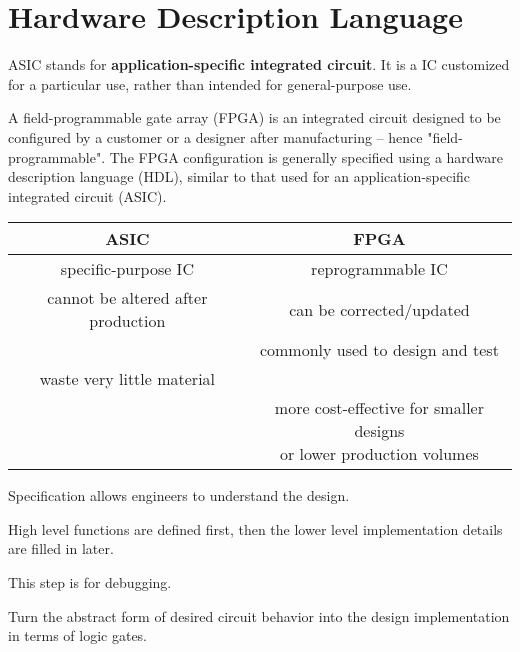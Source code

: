 \chapter{Hardware Description Language}

        \par ASIC stands for \textbf{application-specific integrated circuit}.
        It is a IC customized for a particular use, rather than intended for
        general-purpose use.
        \par A field-programmable gate array (FPGA) is an integrated circuit
        designed to be configured by a customer or a designer after manufacturing
        – hence "field-programmable". The FPGA configuration is generally
        specified using a hardware description language (HDL), similar to that
        used for an application-specific integrated circuit (ASIC).
    \begin{center}
        \begin{tabular}{|c|c|}
            \hline 
            ASIC & FPGA \\ 
            \hline 
            specific-purpose IC & reprogrammable IC \\ 
            \hline 
            cannot be altered after production & can be corrected/updated \\ 
            \hline 
            & commonly used to design and test \\ 
            \hline 
            waste very little material &  \\ 
            \hline 
            & \specialcell{more cost-effective for smaller designs \\ or lower production volumes} \\ 
            \hline 
        \end{tabular} 
    \end{center}

        \par Specification allows engineers to understand the design.
        \par High level functions are defined first, then the lower level implementation
        details are filled in later.
        \par This step is for debugging.
        \par Turn the abstract form of desired circuit behavior into the design
        implementation in terms of logic gates.

